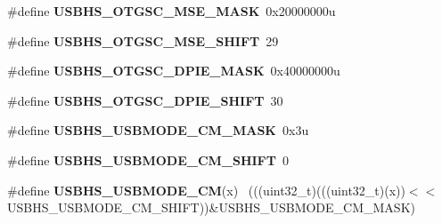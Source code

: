 \begin{DoxyCompactItemize}
\item 
\hypertarget{group___u_s_b_h_s___register___masks_gaab6b7626681485e4982c55d2238c4d8c}{}\#define {\bfseries U\+S\+B\+H\+S\+\_\+\+O\+T\+G\+S\+C\+\_\+\+M\+S\+E\+\_\+\+M\+A\+S\+K}~0x20000000u\label{group___u_s_b_h_s___register___masks_gaab6b7626681485e4982c55d2238c4d8c}

\item 
\hypertarget{group___u_s_b_h_s___register___masks_ga78579fe3cf3be55756ccaedaa2c3bee1}{}\#define {\bfseries U\+S\+B\+H\+S\+\_\+\+O\+T\+G\+S\+C\+\_\+\+M\+S\+E\+\_\+\+S\+H\+I\+F\+T}~29\label{group___u_s_b_h_s___register___masks_ga78579fe3cf3be55756ccaedaa2c3bee1}

\item 
\hypertarget{group___u_s_b_h_s___register___masks_gabba9c56c189e0add964a353a57a22c37}{}\#define {\bfseries U\+S\+B\+H\+S\+\_\+\+O\+T\+G\+S\+C\+\_\+\+D\+P\+I\+E\+\_\+\+M\+A\+S\+K}~0x40000000u\label{group___u_s_b_h_s___register___masks_gabba9c56c189e0add964a353a57a22c37}

\item 
\hypertarget{group___u_s_b_h_s___register___masks_ga05bf2ce5349831a489f51c01711405f0}{}\#define {\bfseries U\+S\+B\+H\+S\+\_\+\+O\+T\+G\+S\+C\+\_\+\+D\+P\+I\+E\+\_\+\+S\+H\+I\+F\+T}~30\label{group___u_s_b_h_s___register___masks_ga05bf2ce5349831a489f51c01711405f0}

\item 
\hypertarget{group___u_s_b_h_s___register___masks_ga284d475a4a24e65a560684ab58d964a5}{}\#define {\bfseries U\+S\+B\+H\+S\+\_\+\+U\+S\+B\+M\+O\+D\+E\+\_\+\+C\+M\+\_\+\+M\+A\+S\+K}~0x3u\label{group___u_s_b_h_s___register___masks_ga284d475a4a24e65a560684ab58d964a5}

\item 
\hypertarget{group___u_s_b_h_s___register___masks_ga4ad63ce77b568c7cc9855e0620641cf2}{}\#define {\bfseries U\+S\+B\+H\+S\+\_\+\+U\+S\+B\+M\+O\+D\+E\+\_\+\+C\+M\+\_\+\+S\+H\+I\+F\+T}~0\label{group___u_s_b_h_s___register___masks_ga4ad63ce77b568c7cc9855e0620641cf2}

\item 
\hypertarget{group___u_s_b_h_s___register___masks_ga6a4be6cad860f37b8ae898a3fdd9c067}{}\#define {\bfseries U\+S\+B\+H\+S\+\_\+\+U\+S\+B\+M\+O\+D\+E\+\_\+\+C\+M}(x)                                        ~(((uint32\+\_\+t)(((uint32\+\_\+t)(x))$<$$<$U\+S\+B\+H\+S\+\_\+\+U\+S\+B\+M\+O\+D\+E\+\_\+\+C\+M\+\_\+\+S\+H\+I\+F\+T))\&U\+S\+B\+H\+S\+\_\+\+U\+S\+B\+M\+O\+D\+E\+\_\+\+C\+M\+\_\+\+M\+A\+S\+K)\label{group___u_s_b_h_s___register___masks_ga6a4be6cad860f37b8ae898a3fdd9c067}


\end{DoxyCompactItemize}
